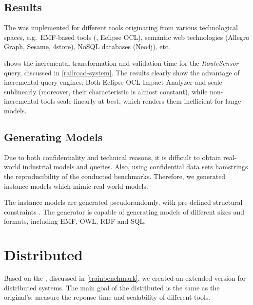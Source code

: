 \subsection{Results}

The \tb{} was implemented for different tools originating from various technological spaces, e.g.\ EMF-based tools (\eiq{}, Eclipse OCL), semantic web technologies (Allegro Graph, Sesame, 4store), NoSQL databases (Neo4j), etc.


 shows the incremental transformation and validation time for the \emph{RouteSensor} query, discussed in \autoref{railroad-system}. The results clearly show the advantage of incremental query engines. Both Eclipse OCL Impact Analyzer and \eiq{} scale sublinearly (moreover, their characteristic is almost constant), while non-incremental tools scale linearly at best, which renders them inefficient for lange models.

\subsection{Generating Models}
\label{trainbenchmark-model-generation}

Due to both confidentiality and technical reasons, it is difficult to obtain real-world industrial models and queries. Also, using confidential data sets hamstrings the reproducibility of the conducted benchmarks. Therefore, we generated instance models which mimic real-world models.

The instance models are generated pseudorandomly, with pre-defined structural constraints \cite{ASE2013}. The generator is capable of generating models of different sizes and formats, including EMF, OWL, RDF and SQL. 


\section{Distributed \tb{}}
\label{distributed-trainbenchmark}

Based on the \tb{}, discussed in \autoref{trainbenchmark}, we created an extended version for distributed systems. The main goal of the distributed \tb{} is the same as the original's: measure the reponse time and scalability of different tools.

